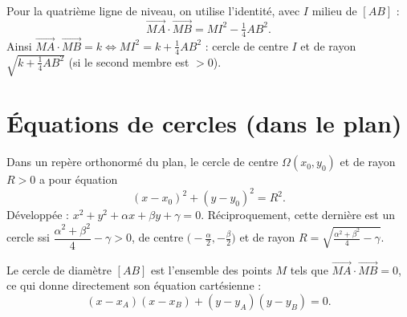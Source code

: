 \begin{illus}
\end{illus}

\begin{remarque}
Pour la quatrième ligne de niveau, on utilise l'identité, avec $I$ milieu de $[AB]$ :
\[
\overrightarrow{MA}\cdot\overrightarrow{MB}=MI^{2}-\tfrac14 AB^{2}.
\]
Ainsi $\overrightarrow{MA}\cdot\overrightarrow{MB}=k\iff MI^{2}=k+\tfrac14 AB^{2}$ :
cercle de centre $I$ et de rayon $\sqrt{k+\frac14 AB^{2}}$ (si le second membre est $>0$).
\end{remarque}

\section{Équations de cercles (dans le plan)}

\begin{theoreme}
Dans un repère orthonormé du plan, le cercle de centre $\Omega(x_0,y_0)$ et de rayon $R>0$
a pour équation
\[
(x-x_0)^{2}+(y-y_0)^{2}=R^{2}.
\]
Développée : $x^{2}+y^{2}+\alpha x+\beta y+\gamma=0$. Réciproquement, cette dernière est
un cercle ssi $\dfrac{\alpha^{2}+\beta^{2}}4-\gamma>0$, de centre $\big(-\tfrac\alpha2,-\tfrac\beta2\big)$
et de rayon $R=\sqrt{\tfrac{\alpha^{2}+\beta^{2}}4-\gamma}$.
\end{theoreme}

\begin{propriete}
Le cercle de diamètre $[AB]$ est l'ensemble des points $M$ tels que
$\overrightarrow{MA}\cdot\overrightarrow{MB}=0$, ce qui donne directement son équation
cartésienne :
\[
(x-x_A)(x-x_B)+(y-y_A)(y-y_B)=0.
\]
\end{propriete}

